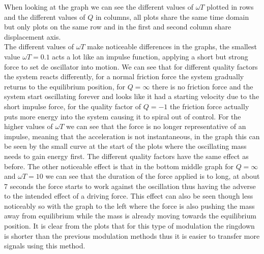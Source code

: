 When looking at the graph we can see the different values of $\omega T$ plotted in rows and the different values of $Q$ in columns, all plots share the same time domain but only plots on the same row and in the first and second column share displacement axis.\\
The different values of $\omega T$ make noticeable differences in the graphs, the smallest value $\omega T = 0.1$ acts a lot like an impulse function, applying a short but strong force to set de oscillator into motion. We can see that for different quality factors the system reacts differently, for a normal friction force the system gradually returns to the equilibrium position, for $Q = \infty$ there is no friction force and the system start oscillating forever and looks like it had a starting velocity due to the short impulse force, for the quality factor of $Q = -1$ the friction force actually puts more energy into the system causing it to spiral out of control.
For the higher values of $\omega T$ we can see that the force is no longer representative of an impulse, meaning that the acceleration is not instantaneous, in the graph this can be seen by the small curve at the start of the plots where the oscillating mass needs to gain energy first. The different quality factors have the same effect as before.
The other noticeable effect is that in the bottom middle graph for $Q=\infty$ and $\omega T = 10$ we can see that the duration of the force applied is to long, at about 7 seconds the force starts to work against the oscillation thus having the adverse to the intended effect of a driving force. This effect can also be seen though less noticeably so with the graph to the left where the force is also pushing the mass away from equilibrium while the mass is already moving towards the equilibrium position.
It is clear from the plots that for this type of modulation the ringdown is shorter than the previous modulation methods thus it is easier to transfer more signals using this method.\\
